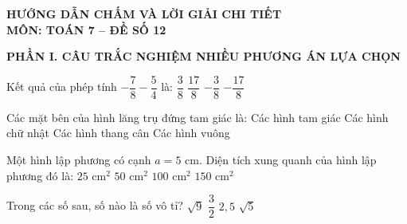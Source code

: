 \documentclass[12pt,a4paper]{article}
\begin{document}
\begin{center}
\textbf{\Large HƯỚNG DẪN CHẤM VÀ LỜI GIẢI CHI TIẾT}\\
\vspace{1mm}
\textbf{\large MÔN: TOÁN 7 -- ĐỀ SỐ 12}
\end{center}
\vspace{2mm}

\noindent\textbf{\large PHẦN I. CÂU TRẮC NGHIỆM NHIỀU PHƯƠNG ÁN LỰA CHỌN}

\vspace{1mm}
\begin{ex}
Kết quả của phép tính $-\dfrac{7}{8} - \dfrac{5}{4}$ là:
\choice
{$\dfrac{3}{8}$}
{$\dfrac{17}{8}$}
{$-\dfrac{3}{8}$}
{\True $-\dfrac{17}{8}$}
\end{ex}

\begin{ex}
Các mặt bên của hình lăng trụ đứng tam giác là:
\choice
{Các hình tam giác}
{\True Các hình chữ nhật}
{Các hình thang cân}
{Các hình vuông}
\end{ex}

\begin{ex}
Một hình lập phương có cạnh $a = 5\text{ cm}$. Diện tích xung quanh của hình lập phương đó là:
\choice
{$25\text{ cm}^2$}
{$50\text{ cm}^2$}
{\True $100\text{ cm}^2$}
{$150\text{ cm}^2$}
\end{ex}

\begin{ex}
Trong các số sau, số nào là số vô tỉ?
\choice
{$\sqrt{9}$}
{$\dfrac{3}{2}$}
{$2{,}5$}
{\True $\sqrt{5}$}
\end{ex}
\end{document}
